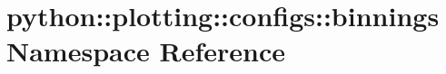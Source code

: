 \hypertarget{namespacepython_1_1plotting_1_1configs_1_1binnings}{
\section{python::plotting::configs::binnings Namespace Reference}
\label{namespacepython_1_1plotting_1_1configs_1_1binnings}
}
